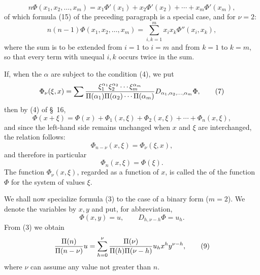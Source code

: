
\begin{equation}
 n\Phi(x_1,x_2,\ldots,x_m)
 =x_1\Phi'(x_1)+x_2\Phi'(x_2)+\cdots+x_m\Phi'(x_m),
\tag{5}
\end{equation}
of which formula (15) of the preceding paragraph is a special case, and for $\nu=2$:
\begin{equation}
 n(n-1)\Phi(x_1,x_2,\ldots,x_m)
 =
 \sum_{i,k=1}^{m}x_i x_k\Phi''(x_i,x_k),
\tag{6}
\end{equation}
where the sum is to be extended from $i=1$ to $i=m$ and from $k=1$ to $k=m$, so that every term with unequal $i,k$ occurs twice in the sum.

If, when the $\alpha$ are subject to the condition (4), we put
\begin{equation}
 \Phi_\nu(\xi,x)=
 \sum {\xi_1^{\alpha_1}\xi_2^{\alpha_2}\cdots\xi_m^{\alpha_m}
 \over \Pi(\alpha_1)\Pi(\alpha_2)\cdots\Pi(\alpha_m)}
 D_{\alpha_1,\alpha_2,\ldots,\alpha_m}\Phi,
\tag{7}
\end{equation}
then by (4) of \S~16,
\begin{equation}
 \Phi(x+\xi)=\Phi(x)+\Phi_1(x,\xi)+\Phi_2(x,\xi)+\cdots+\Phi_n(x,\xi),
\tag{8}
\end{equation}
and since the left-hand side remains unchanged when $x$ and $\xi$ are interchanged, the relation follows:
\begin{equation}
 \Phi_{n-\nu}(x,\xi)=\Phi_\nu(\xi,x),
\tag{9}
\end{equation}
and therefore in particular
\begin{equation}
 \Phi_n(x,\xi)=\Phi(\xi).
\tag{10}
\end{equation}
The function $\Phi_\nu(x,\xi)$, regarded as a function of $x$, is called the  of the function $\Phi$ for the system of values $\xi$.

We shall now specialize formula (3) to the case of a binary form ($m=2$). We denote the variables by $x,y$ and put, for abbreviation,
\[
 \Phi(x,y)=u,\qquad D_{h,\nu-h}\Phi=u_h.
\]
From (3) we obtain
\begin{equation}
 {\Pi(n)\over\Pi(n-\nu)}u
 =
 \sum_{h=0}^{\nu}{\Pi(\nu)\over\Pi(h)\Pi(\nu-h)}
 u_h x^h y^{\nu-h},
\tag{9}%
\end{equation}
where $\nu$ can assume any value not greater than $n$.
